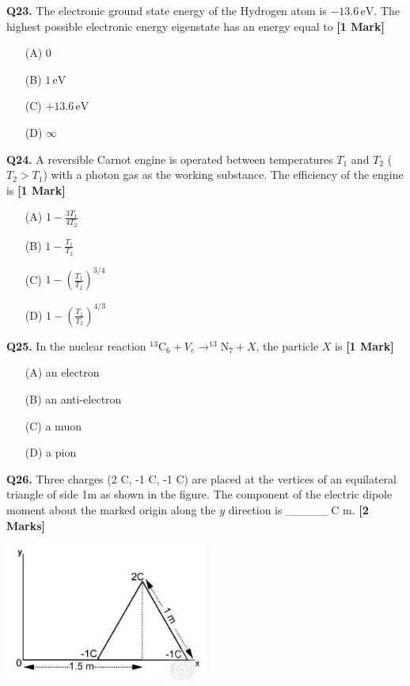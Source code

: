 \documentclass[11pt]{article}
\newcommand{\questiona}[2]{
    \noindent\textbf{Q#2.} #1 \hfill \textbf{[1 Mark]}
}
\newcommand{\questionb}[2]{
    \noindent\textbf{Q#2.} #1 \hfill \textbf{[2 Marks]}
}
\begin{document}
\questiona{The electronic ground state energy of the Hydrogen atom is \(-13.6 \, \text{eV}\). The highest possible electronic energy eigenstate has an energy equal to}{23}
\begin{enumerate}
    \item[(A)] 0
    \item[(B)] \(1 \, \text{eV}\)
    \item[(C)] \(+13.6 \, \text{eV}\)
    \item[(D)] \(\infty\)
\end{enumerate}
\vspace{0.5cm}

\questiona{A reversible Carnot engine is operated between temperatures \(T_1\) and \(T_2\) (\(T_2 > T_1\)) with a photon gas as the working substance. The efficiency of the engine is}{24}
\begin{enumerate}
    \item[(A)] \(1 - \frac{3T_1}{4T_2}\)
    \item[(B)] \(1 - \frac{T_1}{T_2}\)
    \item[(C)] \(1 - \left( \frac{T_1}{T_2} \right)^{3/4}\)
    \item[(D)] \(1 - \left( \frac{T_1}{T_2} \right)^{4/3}\)
\end{enumerate}
\vspace{0.5cm}

\questiona{In the nuclear reaction \(^{13}\text{C}_6 + V_e \rightarrow ^{13}\text{N}_7 + X\), the particle \(X\) is}{25}
\begin{enumerate}
    \item[(A)] an electron
    \item[(B)] an anti-electron
    \item[(C)] a muon
    \item[(D)] a pion
\end{enumerate}
\vspace{0.5cm}

\questionb{Three charges (2 C, -1 C, -1 C) are placed at the vertices of an equilateral triangle of side 1m as shown in the figure. The component of the electric dipole moment about the marked origin along the \( y \) direction is \_\_\_\_\_ C m.}{26}
\begin{center}
\includegraphics[width=0.5\textwidth]{figures/26.png}
\end{center}
\vspace{0.5cm}
\end{document}
